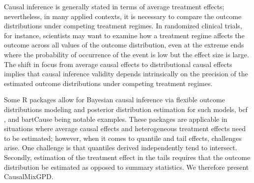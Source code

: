 \documentclass[preprint,12pt,authoryear]{elsarticle}
\newcommand{\pkg}[1]{\textsf{#1}}
\newcommand{\proglang}[1]{\textsf{#1}}
\begin{document}
Causal inference is generally stated in terms of average treatment
effects; nevertheless, in many applied contexts, it is necessary to
compare the outcome distributions under competing treatment regimes.
In randomized clinical trials, for instance, scientists may want to
examine how a treatment regime affects the outcome across all values
of the outcome distribution, even at the extreme ends where the
probability of occurrence of the event is low but the effect size is
large. The shift in focus from average causal effects to
distributional causal effects implies that causal inference validity
depends intrinsically on the precision of the estimated outcome
distributions under competing treatment regimes.

Some \proglang{R} packages allow for Bayesian causal inference via
flexible outcome distributions modeling and posterior distribution
estimation for such models,
\proglang{bcf} \citep{bcf_method,bcf_pkg}, and \pkg{bartCause}
\citep{bartCause_method,bartCause_pkg} being notable examples. These packages are
applicable in situations where average causal effects and
heterogeneous treatment effects need to be estimated; however, when it
comes to quantile and tail effects, challenges arise. One challenge
is that quantiles derived independently tend to intersect. Secondly,
estimation of the treatment effect in the tails requires that the
outcome distribution be estimated as opposed to summary statistics.
We therefore present \pkg{CausalMixGPD}.
\end{document}
